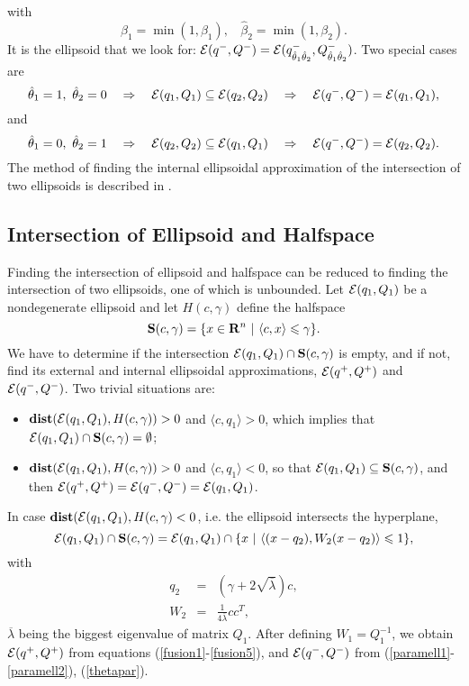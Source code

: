 with
\[ \hat{\beta}_1=\min(1,\beta_1), ~~~~ \hat{\beta}_2=\min(1,\beta_2). \]
It is the ellipsoid that we look for:
$\EE(q^-,Q^-)=\EE(q^-_{\hat{\theta}_1\hat{\theta}_2},Q^-_{\hat{\theta}_1\hat{\theta}_2})$.
Two special cases are
\[ \hat{\theta}_1=1, ~ \hat{\theta}_2=0 ~~~ \Rightarrow ~~~
\EE(q_1,Q_1)\subseteq\EE(q_2,Q_2) ~~~ \Rightarrow ~~~
\EE(q^-,Q^-)=\EE(q_1,Q_1), \]
and
\[ \hat{\theta}_1=0, ~ \hat{\theta}_2=1 ~~~ \Rightarrow ~~~
\EE(q_2,Q_2)\subseteq\EE(q_1,Q_1) ~~~ \Rightarrow ~~~
\EE(q^-,Q^-)=\EE(q_2,Q_2). \]
The method of finding the internal ellipsoidal approximation of the
intersection of two ellipsoids is described in \cite{vazhen}.


\subsection{Intersection of Ellipsoid and Halfspace}
Finding the intersection of ellipsoid and halfspace can be reduced to
finding the intersection of two ellipsoids, one of which is unbounded.
Let $\EE(q_1,Q_1)$ be a nondegenerate ellipsoid and let  $H(c,\gamma)$
define the halfspace
\[ {\bf S}(c,\gamma) = \{x\in{\bf R}^n ~|~ \langle c,x\rangle\leq\gamma\}. \]
We have to determine if the intersection $\EE(q_1,Q_1)\cap{\bf S}(c,\gamma)$
is empty, and if not, find its external and internal ellipsoidal approximations,
$\EE(q^+,Q^+)$ and $\EE(q^-,Q^-)$.
Two trivial situations are:
\begin{itemize}
\item ${\bf dist}(\EE(q_1,Q_1),H(c,\gamma))>0$ and $\langle c, q_1\rangle>0$,
which implies that $\EE(q_1,Q_1)\cap{\bf S}(c,\gamma)=\emptyset$;
\item ${\bf dist}(\EE(q_1,Q_1),H(c,\gamma))>0$ and $\langle c, q_1\rangle<0$,
so that $\EE(q_1,Q_1)\subseteq{\bf S}(c,\gamma)$, and then
$\EE(q^+,Q^+)=\EE(q^-,Q^-)=\EE(q_1,Q_1)$.
\end{itemize}
In case ${\bf dist}(\EE(q_1,Q_1),H(c,\gamma)<0$, i.e. the ellipsoid
intersects the hyperplane,
\[ \EE(q_1,Q_1)\cap{\bf S}(c,\gamma) =
\EE(q_1,Q_1)\cap\{x ~|~ \langle (x-q_2),W_2(x-q_2)\rangle\leq1\}, \]
with
\begin{eqnarray}
q_2 & = & (\gamma + 2\sqrt{\overline{\lambda}})c,\label{hsell1} \\
W_2 & = & \frac{1}{4\overline{\lambda}}cc^T,\label{hsell2}
\end{eqnarray}
 $\overline{\lambda}$ being the biggest eigenvalue of matrix $Q_1$.
After defining $W_1=Q_1^{-1}$, we obtain $\EE(q^+,Q^+)$ from  equations
(\ref{fusion1}-\ref{fusion5}), and $\EE(q^-,Q^-)$ from
(\ref{paramell1}-\ref{paramell2}), (\ref{thetapar}).

